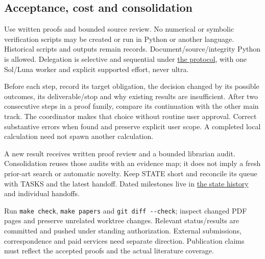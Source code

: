 \documentclass[11pt,a4paper]{article}
\begin{document}
\hypertarget{acceptance-cost-and-consolidation}{%
\subsection{Acceptance, cost and
consolidation}\label{acceptance-cost-and-consolidation}}

Use written proofs and bounded source review. No numerical or symbolic
verification scripts may be created or run in Python or another
language. Historical scripts and outputs remain records.
Document/source/integrity Python is allowed. Delegation is selective and
sequential under \href{../agents/PROTOCOL.md}{the protocol}, with one
Sol/Luna worker and explicit supported effort, never ultra.

Before each step, record its target obligation, the decision changed by
its possible outcomes, its deliverable/stop and why existing results are
insufficient. After two consecutive steps in a proof family, compare its
continuation with the other main track. The coordinator makes that
choice without routine user approval. Correct substantive errors when
found and preserve explicit user scope. A completed local calculation
need not spawn another calculation.

A new result receives written proof review and a bounded librarian
audit. Consolidation reuses those audits with an evidence map; it does
not imply a fresh prior-art search or automatic novelty. Keep STATE
short and reconcile its queue with TASKS and the latest handoff. Dated
milestones live in \href{STATE-history-2026-09-12.md}{the state history}
and individual handoffs.

Run \texttt{make\ check}, \texttt{make\ papers} and
\texttt{git\ diff\ -\/-check}; inspect changed PDF pages and preserve
unrelated worktree changes. Relevant status/results are committed and
pushed under standing authorization. External submissions,
correspondence and paid services need separate direction. Publication
claims must reflect the accepted proofs and the actual literature
coverage.
\end{document}
